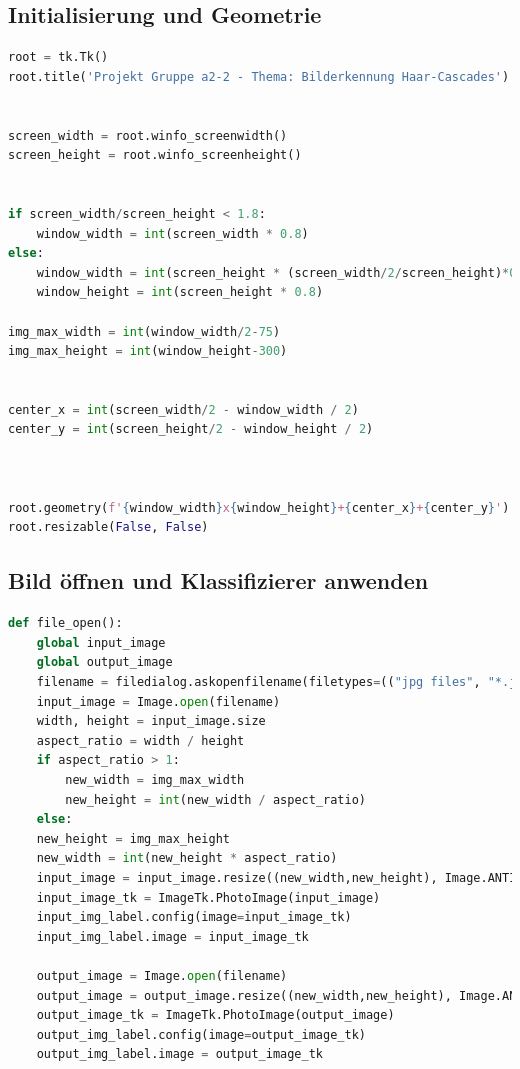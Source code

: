 \documentclass{article}
\begin{document}

\subsection{Initialisierung und Geometrie}
\begin{lstlisting}[language=Python]
root = tk.Tk()
root.title('Projekt Gruppe a2-2 - Thema: Bilderkennung Haar-Cascades')


screen_width = root.winfo_screenwidth()
screen_height = root.winfo_screenheight()


if screen_width/screen_height < 1.8:
	window_width = int(screen_width * 0.8)
else: 
	window_width = int(screen_height * (screen_width/2/screen_height)*0.8)
	window_height = int(screen_height * 0.8)

img_max_width = int(window_width/2-75)
img_max_height = int(window_height-300) 


center_x = int(screen_width/2 - window_width / 2)
center_y = int(screen_height/2 - window_height / 2)



root.geometry(f'{window_width}x{window_height}+{center_x}+{center_y}')
root.resizable(False, False)
\end{lstlisting}


\newpage
\subsection{Bild öffnen und Klassifizierer anwenden}
\begin{lstlisting}[language=Python]
def file_open():
	global input_image
	global output_image
	filename = filedialog.askopenfilename(filetypes=(("jpg files", "*.jpg"),("png files", "*.png")))
	input_image = Image.open(filename)
	width, height = input_image.size
	aspect_ratio = width / height
	if aspect_ratio > 1:
		new_width = img_max_width
		new_height = int(new_width / aspect_ratio)
	else:  
	new_height = img_max_height
	new_width = int(new_height * aspect_ratio)
	input_image = input_image.resize((new_width,new_height), Image.ANTIALIAS)
	input_image_tk = ImageTk.PhotoImage(input_image)
	input_img_label.config(image=input_image_tk)
	input_img_label.image = input_image_tk

	output_image = Image.open(filename)
	output_image = output_image.resize((new_width,new_height), Image.ANTIALIAS)
	output_image_tk = ImageTk.PhotoImage(output_image)
	output_img_label.config(image=output_image_tk)
	output_img_label.image = output_image_tk
\end{lstlisting}
\end{document}
